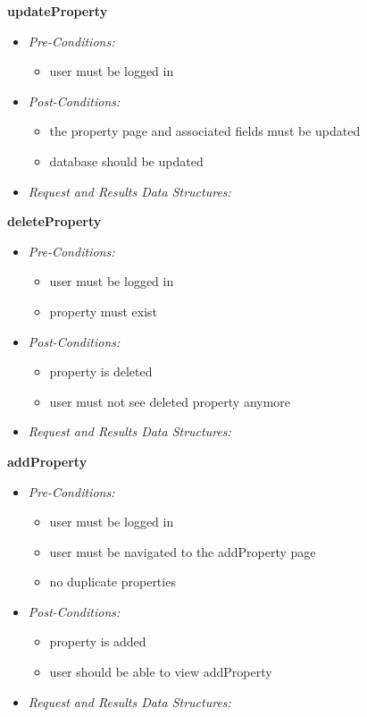 \documentclass[a4paper,12pt]{article}
\begin{document}
\textbf{\large{updateProperty}}
	\begin{itemize}
		\item \textit{Pre-Conditions:}
			\begin{itemize}
				\item user must be logged in 
			\end{itemize}
		\item \textit{Post-Conditions:}
			\begin{itemize}
				\item the property page and associated fields must be updated
				\item database should be updated 
			\end{itemize}
		\item \textit{Request and Results Data Structures:}
	\end{itemize}
\textbf{\large{deleteProperty}}
	\begin{itemize}
		\item \textit{Pre-Conditions:}
			\begin{itemize}
				\item user must be logged in 
				\item property must exist
			\end{itemize}
		\item \textit{Post-Conditions:}
			\begin{itemize}
				\item property is deleted
				\item user must not see deleted property anymore
			\end{itemize}
		\item \textit{Request and Results Data Structures:}
	\end{itemize}
\textbf{\large{addProperty}}
	\begin{itemize}
		\item \textit{Pre-Conditions:}
			\begin{itemize}
				\item user must be logged in
				\item user must be navigated to the addProperty page 
				\item no duplicate properties
			\end{itemize}
		\item \textit{Post-Conditions:}
			\begin{itemize}
				\item property is added
				\item user should be able to view addProperty
			\end{itemize}
		\item \textit{Request and Results Data Structures:}
	\end{itemize}
\end{document}
